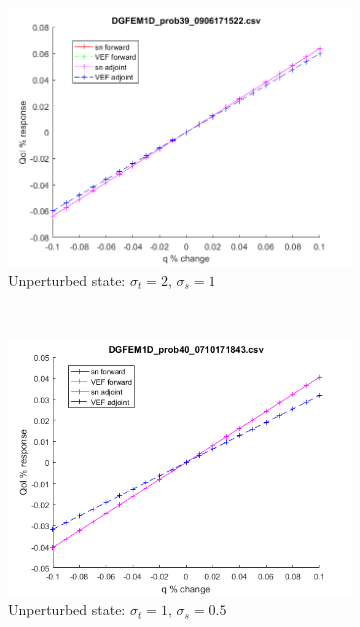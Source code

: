\documentclass{article}
\newcommand{\sigt}{\sigma_t}
\newcommand{\sigs}{\sigma_s}
\begin{document}
\begin{figure}[H]
\label{InHomoPertq}
\centering
\begin{subfigure}{.65\textwidth}
  \centering
  \includegraphics[width=.98\linewidth]{figures/39qSens.png}
  \caption{Unperturbed state: $\sigt=2$, $\sigs=1$}
  \label{fig:sfig1}
\end{subfigure}%
\\
\begin{subfigure}{.65\textwidth}
  \centering
  \includegraphics[width=.98\linewidth]{figures/40qSens.png}
  \caption{Unperturbed state: $\sigt=1$, $\sigs=0.5$}
  \label{fig:sfig2}
\end{subfigure}
\\
\begin{subfigure}{.65\textwidth}

\end{subfigure}
\end{figure}
\end{document}

